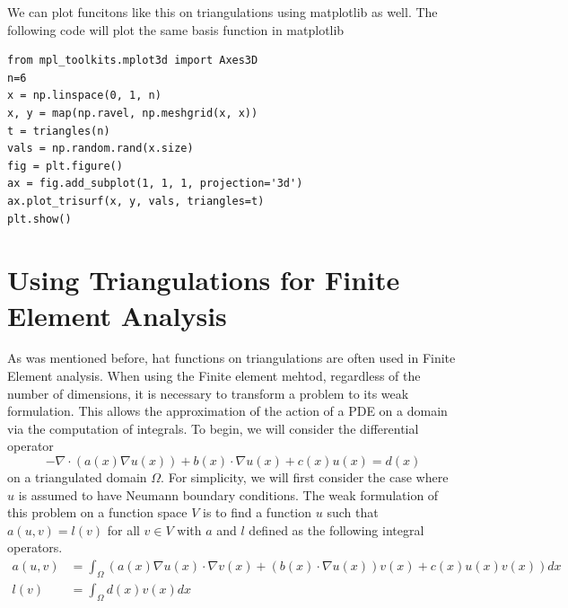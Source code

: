 We can plot funcitons like this on triangulations using matplotlib as well.
The following code will plot the same basis function in matplotlib
\begin{lstlisting}
from mpl_toolkits.mplot3d import Axes3D
n=6
x = np.linspace(0, 1, n)
x, y = map(np.ravel, np.meshgrid(x, x))
t = triangles(n)
vals = np.random.rand(x.size)
fig = plt.figure()
ax = fig.add_subplot(1, 1, 1, projection='3d')
ax.plot_trisurf(x, y, vals, triangles=t)
plt.show()
\end{lstlisting}

\section*{Using Triangulations for Finite Element Analysis}

As was mentioned before, hat functions on triangulations are often used in Finite Element analysis.
When using the Finite element mehtod, regardless of the number of dimensions, it is necessary to transform a problem to its weak formulation.
This allows the approximation of the action of a PDE on a domain via the computation of integrals.
To begin, we will consider the differential operator
\[-\nabla \cdot \left(a\left(x\right) \nabla u\left(x\right)\right) + b\left(x\right) \cdot \nabla u\left(x\right) + c\left(x\right) u\left(x\right) = d\left(x\right)\]
on a triangulated domain $\Omega$.
For simplicity, we will first consider the case where $u$ is assumed to have Neumann boundary conditions.
The weak formulation of this problem on a function space $V$ is to find a function $u$ such that $a\left(u, v\right) = l\left(v\right)$ for all $v \in V$ with $a$ and $l$ defined as the following integral operators.
\begin{align*}
a\left(u, v\right) &= \int_\Omega \left( a\left(x\right) \nabla u\left(x\right) \cdot \nabla v\left(x\right) + \left(b\left(x\right) \cdot \nabla u\left(x\right)\right) v\left(x\right) + c\left(x\right) u\left(x\right) v\left(x\right) \right) dx\\
l\left(v\right) &= \int_\Omega d\left(x\right) v\left(x\right) dx
\end{align*}

